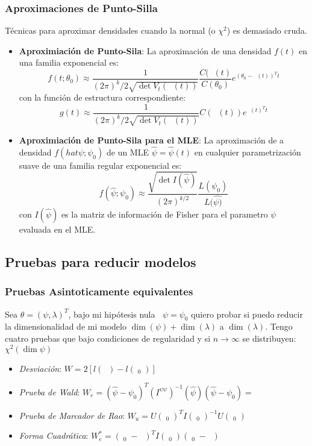 \documentclass[pdftex,11pt,a4paper]{article}
\DeclareMathOperator{\that}{\mathbf{\hat{\theta}}}
\DeclareMathOperator*{\Ho}{H_0:}
\begin{document}
\subsubsection{Aproximaciones de Punto-Silla}
Técnicas para aproximar densidades cuando la normal (o $\chi^2$) es demasiado cruda.
\begin{itemize}
	\item \textbf{Aproximiación de Punto-Sila}: La aproximación de una densidad $f(t)$ en una familia exponencial es: $$f(t;\theta_0) \approx \dfrac{1}{(2\pi)^k/2\sqrt{\det V_t(\that(t))}}\dfrac{C(\that(t)}{C(\theta_0)}e^{(\theta_0 - \that(t))^Tt}$$ con la función de estructura correspondiente: $$g(t) \approx \dfrac{1}{(2\pi)^k/2\sqrt{\det V_t(\that(t))}}C(\that(t))e^{\that(t)^Tt}$$
	\item \textbf{Aproximiación de Punto-Sila para el MLE}: La aproximación de a densidad $f(hat{\psi};\psi_0)$ de un MLE $\hat{\psi} = \hat{\psi}(t)$ en cualquier parametrización suave de una familia regular exponencial es: $$f(\hat{\psi};\psi_0) \approx \dfrac{\sqrt{\det I(\hat{\psi})}}
	{(2\pi)^{k/2}}\dfrac{L(\psi_0)}{L(\hat{\psi)}}$$ con $I(\hat{\psi})$ es la matriz de información de Fisher para el parametro $\psi$ evaluada en el MLE.
\end{itemize}
	
\subsection{Pruebas para reducir modelos}
\subsubsection{Pruebas Asintoticamente equivalentes}
Sea $\theta = (\psi,\lambda)^T$, bajo mi hipótesis nula $\Ho \psi = \psi_0$ quiero probar si puedo reducir la dimensionalidad de mi modelo  $\dim(\psi) + \dim(\lambda)$ a $\dim(\lambda)$. Tengo cuatro pruebas que bajo condiciones de regularidad y si $n\rightarrow\infty$ se distribuyen: $\chi^2(\dim\psi)$
\begin{itemize}
	\item \emph{Desviación}: $W = 2[l(\that)-l(\that_0)]$
	\item \emph{Prueba de Wald}: $W_e = (\hat{\psi}-\psi_0)^T(I^{\psi\psi})^{-1}(\hat{\psi})(\hat{\psi}-\psi_0)=$
	\item \emph{Prueba de Marcador de Rao}: $W_u = U(\that_0)^T I(\that_0)^{-1}U(\that_0)$
	\item \emph{Forma Cuadrática}: $W_e^* = (\that_0-\that)^TI(\that_0)(\that_0-\that)$
\end{itemize}
\end{document}
